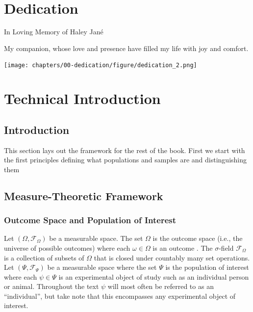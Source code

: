 \documentclass[
  letterpaper,
  DIV=11,
  numbers=noendperiod]{scrreprt}
\begin{document}

\chapter{Dedication}\label{dedication}

In Loving Memory of Haley Jané

My companion, whose love and presence have filled my life with joy and
comfort.

\begin{center}
\texttt{[image: chapters/00-dedication/figure/dedication\_2.png]}
\end{center}


\chapter{Technical Introduction}\label{technical-introduction}

\section{Introduction}\label{introduction}

This section lays out the framework for the rest of the book. First we
start with the first principles defining what populations and samples
are and distinguishing them

\section{Measure-Theoretic Framework}\label{measure-theoretic-framework}

\subsection{Outcome Space and Population of
Interest}\label{outcome-space-and-population-of-interest}

Let \((\Omega,\mathcal{F}_\Omega)\) be a measurable space. The set
\(\Omega\) is the outcome space (i.e., the universe of possible
outcomes) where each \(\omega \in \Omega\) is an outcome . The
\(\sigma\)-field \(\mathcal{F}_\Omega\) is a collection of subsets of
\(\Omega\) that is closed under countably many set operations. Let
\((\Psi, \mathcal{F}_\Psi)\) be a measurable space where the set
\(\Psi\) is the population of interest where each \(\psi \in \Psi\) is
an experimental object of study such as an individual person or animal.
Throughout the text \(\psi\) will most often be referred to as an
``individual'', but take note that this encompasses any experimental
object of interest.
\end{document}

